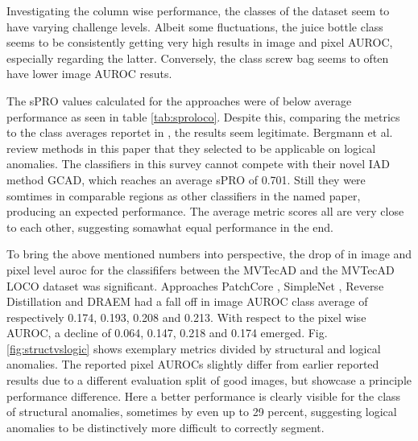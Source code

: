 

Investigating the column wise performance, the classes of the dataset seem to have varying challenge levels. Albeit some fluctuations, 
the juice bottle class seems to be consistently getting very high results in image and pixel AUROC, especially regarding the latter. 
Conversely, the class screw bag seems to often have lower image AUROC resuts.




The sPRO values calculated for the approaches were of below average performance as seen in table \ref{tab:sproloco}. Despite this, comparing the metrics to the 
class averages reportet in \cite{LOCODentsAndScratchesBergmann2022}, the results seem legitimate. Bergmann et al. review methods 
in this paper that they selected to be applicable on logical anomalies. The classifiers in this survey cannot compete with their novel IAD method GCAD, which reaches an 
average sPRO of 0.701. Still they were somtimes in comparable regions as other classifiers in the named paper, producing an expected performance. 
The average metric scores all are very close to each other, suggesting somawhat equal performance in the end.





To bring the above mentioned numbers into perspective, the drop of in image and pixel level auroc for the classififers between the 
MVTecAD \cite{MVTEC_Bergmann_2021} and the MVTecAD LOCO \cite{LOCODentsAndScratchesBergmann2022} dataset was significant. Approaches 
PatchCore \cite{patchCore2022}, SimpleNet \cite{liu2023simplenet}, Reverse Distillation \cite{revdist2023} and DRAEM \cite{Zavrtanik_2021DRAEM} had a fall off 
in image AUROC class average of respectively 0.174, 0.193, 0.208 and 0.213. With respect to the pixel wise 
AUROC, a decline of 0.064, 0.147, 0.218 and 0.174 emerged. \newline
Fig. \ref{fig:structvslogic} shows exemplary metrics divided by structural and logical anomalies. The reported pixel AUROCs slightly differ from earlier reported results due to a different 
evaluation split of good images, but showcase a principle performance difference. Here a better performance is clearly visible for the 
class of structural anomalies, sometimes by even up to 29 percent, suggesting logical anomalies to be distinctively more difficult to correctly segment.

